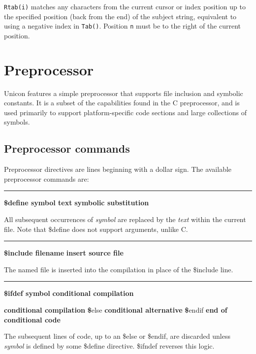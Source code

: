 \noindent
\texttt{Rtab(i)} matches any characters from the current cursor or
index position up to 
the specified position (back from the end) of the subject string,
equivalent to using a negative index in \texttt{Tab()}.
Position \texttt{n} must be to the right of the current position.\\


\section{Preprocessor}

Unicon features a simple preprocessor that supports file
inclusion and symbolic constants. It is a subset of the capabilities found in
the C preprocessor, and is used primarily to support platform-specific code
sections and large collections of symbols.

\subsection*{Preprocessor commands}

Preprocessor directives are lines beginning with a dollar sign. The
available preprocessor commands are:

\bigskip\hrule\vspace{0.1cm}
\noindent
{\bf \$define symbol text } \hfill {\bf symbolic substitution}

\noindent
{}All subsequent occurrences of \textit{symbol} are
replaced by the \textit{text} within the current file. Note that
\$define does not support arguments, unlike C.

\bigskip\hrule\vspace{0.1cm}
\noindent
{\bf \$include filename } \hfill {\bf insert source file}

\noindent
{}The named file is inserted into the compilation in place
of the \$include line.

\bigskip\hrule\vspace{0.1cm}
\noindent
{\bf \$ifdef symbol } \hfill {\bf conditional compilation}

\noindent
{} \hfill {\bf conditional compilation}
\linebreak
{\textbf \$else } \hfill {\bf conditional alternative}
\linebreak
{\textbf \$endif } \hfill {\bf end of conditional code}

The subsequent lines of code, up to an \$else or \$endif, are discarded
unless \textit{symbol} is defined by some \$define directive. \$ifndef
reverses this logic.

